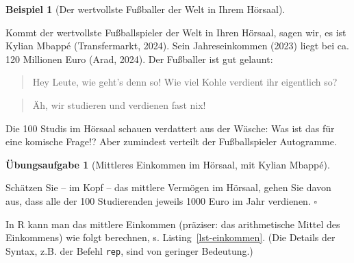 \documentclass[
  letterpaper,
  twoside,
  open=any]{scrbook}
\theoremstyle{definition}
\newtheorem{exercise}{Übungsaufgabe}[chapter]
\theoremstyle{definition}
\newtheorem{example}{Beispiel}[chapter]
\theoremstyle{definition}
\theoremstyle{remark}
\begin{document}
\begin{example}[Der wertvollste Fußballer der Welt in Ihrem
Hörsaal]\protect\hypertarget{exm-md}{}\label{exm-md}

Kommt der wertvollste Fußballspieler der Welt in Ihren Hörsaal, sagen
wir, es ist Kylian Mbappé (Transfermarkt, 2024). Sein Jahreseinkommen
(2023) liegt bei ca. 120 Millionen Euro (Arad, 2024). Der Fußballer ist
gut gelaunt:

\begin{quote}
{} Hey Leute, wie geht's denn so! Wie viel Kohle
verdient ihr eigentlich so?
\end{quote}

\begin{quote}
{} Äh, wir studieren und verdienen fast nix!
\end{quote}

Die 100 Studis im Hörsaal schauen verdattert aus der Wäsche: Was ist das
für eine komische Frage!? Aber zumindest verteilt der Fußballspieler
Autogramme.

\end{example}

\begin{exercise}[Mittleres Einkommen im Hörsaal, mit Kylian
Mbappé]\protect\hypertarget{exr-elon}{}\label{exr-elon}

Schätzen Sie -- im Kopf -- das mittlere Vermögen im Hörsaal, gehen Sie
davon aus, dass alle der 100 Studierenden jeweils 1000 Euro im Jahr
verdienen. \(\square\)

\end{exercise}

In R kann man das mittlere Einkommen (präziser: das arithmetische Mittel
des Einkommens) wie folgt berechnen, s. Listing~\ref{lst-einkommen}.
(Die Details der Syntax, z.B. der Befehl \texttt{rep}, sind von geringer
Bedeutung.)
\end{document}

